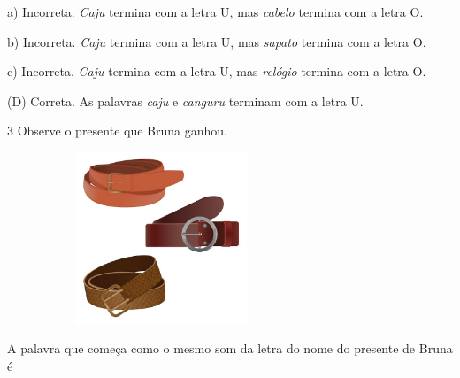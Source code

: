 
a) Incorreta. \textit{Caju} termina com a letra U, mas \textit{cabelo} termina com a letra O.

b) Incorreta. \textit{Caju} termina com a letra U, mas \textit{sapato} termina com a letra O.

c) Incorreta. \textit{Caju} termina com a letra U, mas \textit{relógio} termina com a letra O.

(D) Correta. As palavras \textit{caju} e \textit{canguru} terminam com a letra U.


\num{3} Observe o presente que Bruna ganhou.

\includegraphics[width=3.62413in,height=2.01875in]{media/image48.jpeg}


A palavra que começa como o mesmo som da letra do nome do presente de Bruna é

